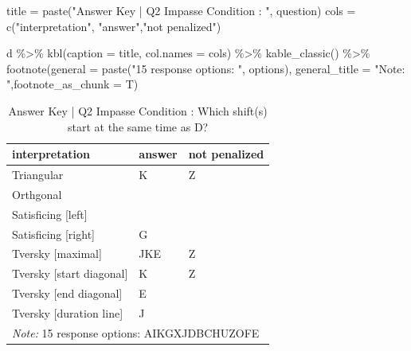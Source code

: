 \documentclass[
  letterpaper,
  DIV=11,
  numbers=noendperiod]{scrreprt}
\newenvironment{Shaded}{\begin{snugshade}}{\end{snugshade}}
\newcommand{\AttributeTok}[1]{\textcolor[rgb]{0.40,0.45,0.13}{#1}}
\newcommand{\FunctionTok}[1]{\textcolor[rgb]{0.28,0.35,0.67}{#1}}
\newcommand{\NormalTok}[1]{\textcolor[rgb]{0.00,0.23,0.31}{#1}}
\newcommand{\OtherTok}[1]{\textcolor[rgb]{0.00,0.23,0.31}{#1}}
\newcommand{\SpecialCharTok}[1]{\textcolor[rgb]{0.37,0.37,0.37}{#1}}
\newcommand{\StringTok}[1]{\textcolor[rgb]{0.13,0.47,0.30}{#1}}
\begin{document}
\begin{Shaded}
\begin{Highlighting}[]
\NormalTok{title }\OtherTok{=} \FunctionTok{paste}\NormalTok{(}\StringTok{"Answer Key | Q2 Impasse Condition : "}\NormalTok{, question)}
\NormalTok{cols }\OtherTok{=} \FunctionTok{c}\NormalTok{(}\StringTok{"interpretation"}\NormalTok{, }\StringTok{"answer"}\NormalTok{,}\StringTok{"not penalized"}\NormalTok{)}

\NormalTok{d }\SpecialCharTok{\%\textgreater{}\%} \FunctionTok{kbl}\NormalTok{(}\AttributeTok{caption =}\NormalTok{ title, }\AttributeTok{col.names =}\NormalTok{ cols) }\SpecialCharTok{\%\textgreater{}\%} \FunctionTok{kable\_classic}\NormalTok{() }\SpecialCharTok{\%\textgreater{}\%} 
  \FunctionTok{footnote}\NormalTok{(}\AttributeTok{general =} \FunctionTok{paste}\NormalTok{(}\StringTok{"15 response options: "}\NormalTok{, options), }\AttributeTok{general\_title =} \StringTok{"Note: "}\NormalTok{,}\AttributeTok{footnote\_as\_chunk =}\NormalTok{ T) }
\end{Highlighting}
\end{Shaded}

\begin{table}

\caption{Answer Key | Q2 Impasse Condition :  Which shift(s) start at the same time as D?}
\centering
\begin{tabular}[t]{l|l|l}
\hline
interpretation & answer & not penalized\\
\hline
Triangular & K & Z\\
\hline
Orthgonal &  & \\
\hline
Satisficing [left] &  & \\
\hline
Satisficing [right] & G & \\
\hline
Tversky [maximal] & JKE & Z\\
\hline
Tversky [start diagonal] & K & Z\\
\hline
Tversky [end diagonal] & E & \\
\hline
Tversky [duration line] & J & \\
\hline
\multicolumn{3}{l}{\rule{0pt}{1em}\textit{Note: } 15 response options:  AIKGXJDBCHUZOFE}\\
\end{tabular}
\end{table}
\end{document}
